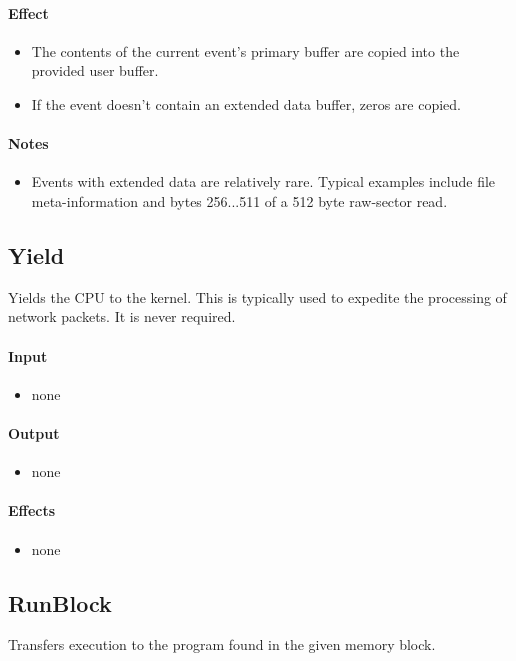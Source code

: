 \paragraph{Effect}
\begin{itemize}
\item The contents of the current event's primary buffer are copied into the provided user buffer.
\item If the event doesn't contain an extended data buffer, zeros are copied.
\end{itemize}

\paragraph{Notes}
\begin{itemize}
\item Events with extended data are relatively rare.  Typical examples include file meta-information and bytes 256...511 of a 512 byte raw-sector read. 
\end{itemize}


\subsection*{Yield}
Yields the CPU to the kernel.  This is typically used to expedite the processing of network packets.  It is never required.

\paragraph{Input}
\begin{itemize}
\item none
\end{itemize}

\paragraph{Output}
\begin{itemize}
\item none
\end{itemize}

\paragraph{Effects}
\begin{itemize}
\item none
\end{itemize}


\subsection*{RunBlock}
Transfers execution to the program found in the given memory block.

